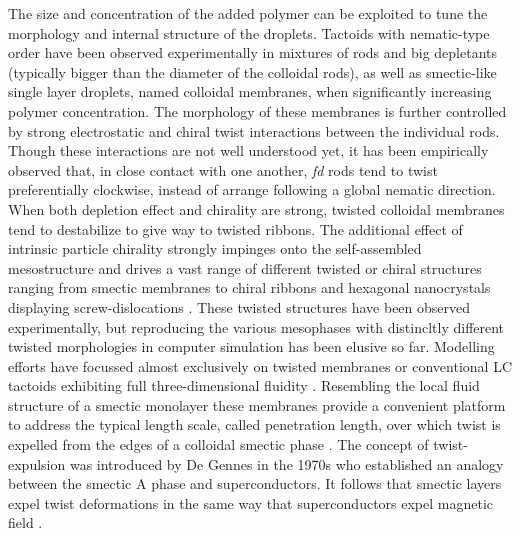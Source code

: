  The size and concentration of the added polymer can be exploited to  tune the morphology and internal structure of the droplets. Tactoids with nematic-type order have been observed experimentally in mixtures of rods and big depletants (typically bigger than the diameter of the colloidal rods), as well as smectic-like single layer droplets, named colloidal membranes, when significantly increasing polymer concentration. The morphology of these membranes is further controlled by strong electrostatic and chiral twist interactions between the individual rods. Though these interactions are not well understood yet, it has been empirically observed that, in close contact with one another, {\em fd} rods tend to twist preferentially clockwise, instead of arrange following a global nematic direction. When both depletion effect and chirality are strong, twisted colloidal membranes tend to destabilize to give way to twisted ribbons. The additional effect of intrinsic particle chirality
strongly impinges  onto the self-assembled mesostructure and drives a vast range of different twisted or chiral structures ranging from smectic membranes to chiral ribbons  \cite{Gibaud2012} and hexagonal nanocrystals displaying screw-dislocations \cite{grelet1}. These twisted structures have been observed experimentally, but reproducing the various mesophases with distincltly different twisted morphologies in computer simulation has been elusive so far.  Modelling efforts have focussed almost exclusively on twisted membranes \cite{kang_sm2016,wensink2018elastic,kuhnhold2022colloidal} or conventional LC tactoids exhibiting full three-dimensional fluidity \cite{prinsen2003shape,prinsen2004parity,kuhnhold2022structure}. Resembling the local fluid structure of a smectic monolayer these membranes  provide a convenient platform  to address the typical length scale, called penetration length, over which twist is expelled from the edges of a colloidal smectic phase \cite{barry2009direct}. The concept of twist-expulsion was introduced by De Gennes in the 1970s who established an analogy between the smectic A phase and superconductors. It follows that smectic layers expel twist deformations in the same way that superconductors expel magnetic field \cite{gennes-prost}.



